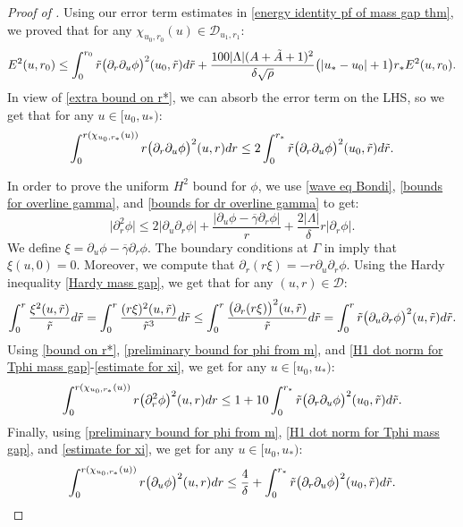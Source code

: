 \documentclass[11pt]{article}
\numberwithin{equation}{section}
\begin{document}
\begin{proof}[Proof of ]
Using our error term estimates in \eqref{energy identity pf of mass gap thm}, we proved that for any $\chi_{u_0,r_0}(u)\in\mathcal{D}_{u_1,r_1}$:
\[E^2(u,r_0)\leq\int_0^{r_0}\Tilde{r}\big(\partial_r\partial_u\phi\big)^2(u_0,\Tilde{r})d\Tilde{r}+\frac{100|\Lambda|(A+\Tilde{A}+1)^2}{\delta\sqrt{\rho}}\big(|u_*-u_0|+1\big)r_*E^2(u,r_0).\]
In view of \eqref{extra bound on r*}, we can absorb the error term on the LHS, so we get that for any $u\in[u_0,u_*):$
\begin{equation}\label{H1 dot norm for Tphi mass gap}
    \int_0^{r(\chi_{u_0,r_*}(u))}r\big(\partial_r\partial_u\phi\big)^2(u,r)dr\leq2\int_0^{r_*}\Tilde{r}\big(\partial_r\partial_u\phi\big)^2(u_0,\Tilde{r})d\Tilde{r}.
\end{equation}

    In order to prove the uniform $H^2$ bound for $\phi$, we use \eqref{wave eq Bondi}, \eqref{bounds for overline gamma}, and \eqref{bounds for dr overline gamma} to get:
    \begin{equation}\label{pointwise bound for dr2 phi}
        \big|\partial_r^2\phi\big|\leq2\big|\partial_u\partial_r\phi\big|+\frac{\big|\partial_u\phi-\overline{\gamma}\partial_r\phi\big|}{r}+\frac{2|\Lambda|}{\delta}r\big|\partial_r\phi\big|.
    \end{equation}
    We define $\xi=\partial_u\phi-\overline{\gamma}\partial_r\phi.$ The boundary conditions at $\Gamma$ in  imply that $\xi(u,0)=0.$ Moreover, we compute that $\partial_r(r\xi)=-r\partial_u\partial_r\phi$. Using the Hardy inequality \eqref{Hardy mass gap}, we get that for any $(u,r)\in\mathcal{D}$:
    \begin{equation}\label{estimate for xi}
        \int_0^r\frac{\xi^2(u,\Tilde{r})}{\Tilde{r}}d\Tilde{r}=\int_0^r\frac{(r\xi)^2(u,\Tilde{r})}{\Tilde{r}^3}d\Tilde{r}\leq\int_0^r\frac{\big(\partial_r(r\xi)\big)^2(u,\Tilde{r})}{\Tilde{r}}d\Tilde{r}=\int_0^r\Tilde{r}\big(\partial_u\partial_r\phi\big)^2(u,\Tilde{r})d\Tilde{r}.
    \end{equation}
    Using \eqref{bound on r*}, \eqref{preliminary bound for phi from m}, and \eqref{H1 dot norm for Tphi mass gap}-\eqref{estimate for xi}, we get for any $u\in[u_0,u_*):$
\begin{equation}\label{H2 dot norm for phi mass gap}
    \int_0^{r(\chi_{u_0,r_*}(u))}r\big(\partial_r^2\phi\big)^2(u,r)dr\leq1+10\int_0^{r_*}\Tilde{r}\big(\partial_r\partial_u\phi\big)^2(u_0,\Tilde{r})d\Tilde{r}.
\end{equation}
Finally, using \eqref{preliminary bound for phi from m}, \eqref{H1 dot norm for Tphi mass gap}, and \eqref{estimate for xi}, we get for any $u\in[u_0,u_*):$
\begin{equation}\label{L2 norm for phi mass gap}
    \int_0^{r(\chi_{u_0,r_*}(u))}r\big(\partial_u\phi\big)^2(u,r)dr\leq\frac{4}{\delta}+\int_0^{r_*}\Tilde{r}\big(\partial_r\partial_u\phi\big)^2(u_0,\Tilde{r})d\Tilde{r}.
\end{equation}


\end{proof}
\end{document}
